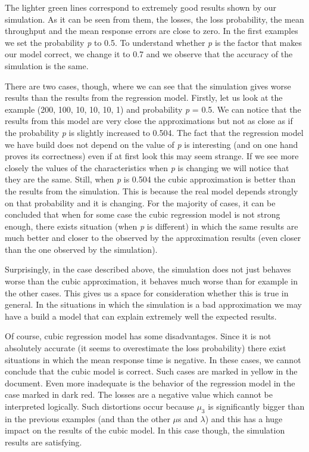 \documentclass[12pt]{article}
\theoremstyle{plain}
\begin{document}
The lighter green lines correspond to extremely good results shown by our
simulation. As it can be seen from them, the losses, the loss probability, the
mean throughput and the mean response errors are close to zero. In the first
examples we set the probability \emph{p} to 0.5. To understand whether \emph{p}
is the factor that makes our model correct, we change it to 0.7 and we observe
that the accuracy of the simulation is the same.

There are two cases, though, where we can see that the simulation gives worse
results than the results from the regression model. Firstly, let us look at the
example (200, 100, 10, 10, 10, 1) and probability \emph{p} = 0.5. We can notice
that the results from this model are very close the approximations but not as
close as if the probability \emph{p} is slightly increased to 0.504. The fact
that the regression model we have build does not depend on the value of
\emph{p} is interesting (and on one hand proves its correctness) even if at
first look this may seem strange. If we see more closely the values of the
characteristics when \emph{p} is changing we will notice that they are the
same. Still, when \emph{p} is 0.504 the cubic approximation is better than the
results from the simulation.  This is because the real model depends strongly
on that probability and it is changing. For the majority of cases, it can be
concluded that when for some case the cubic regression model is not strong
enough, there exists situation (when \emph{p} is different) in which the same
results are much better and closer to the observed by the approximation results
(even closer than the one observed by the simulation).

Surprisingly, in the case described above, the simulation does not just behaves
worse than the cubic approximation, it behaves much worse than for example in
the other cases. This gives us a space for consideration whether this is true in
general. In the situations in which the simulation is a bad approximation we
may have a build a model that can explain extremely well the expected results.

Of course, cubic regression model has some disadvantages. Since it is not
absolutely accurate (it seems to overestimate the loss probability) there exist
situations in which the mean response time is negative. In these cases, we
cannot conclude that the cubic model is correct. Such cases are marked in
yellow in the document.  Even more inadequate is the behavior of the regression
model in the case marked in dark red. The losses are a negative value which
cannot be interpreted logically.  Such distortions occur because $\mu_3$ is
significantly bigger than in the previous examples (and than the other $\mu$s
and $\lambda$) and this has a huge impact on the results of the cubic model. In
this case though, the simulation results are satisfying.
\end{document}
